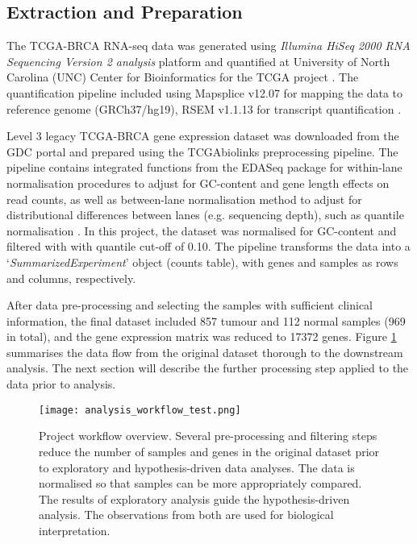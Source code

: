             
    \subsection{Extraction and Preparation}
    
    The TCGA-BRCA RNA-seq data was generated using \textit{Illumina HiSeq 2000 RNA Sequencing Version 2 analysis} platform and quantified at University of North Carolina (UNC) Center for Bioinformatics for the TCGA project \cite{UniversityofNorthCarolinaUNCCenterforBioinfromatics2013TCGAData}. The quantification pipeline included  using Mapsplice v12.07 \cite{wang2010mapsplice} for mapping the data to reference genome (GRCh37/hg19), RSEM v1.1.13 \cite{li2011rsem} for transcript quantification \cite{UniversityofNorthCarolinaUNCCenterforBioinfromatics2013TCGAData}. 

    Level 3 legacy TCGA-BRCA gene expression dataset was downloaded from the GDC portal and prepared using the TCGAbiolinks preprocessing pipeline. The pipeline contains integrated functions from the EDASeq package \cite{risso2011gc} for within-lane normalisation procedures to adjust for GC-content and gene length effects on read counts, as well as between-lane normalisation method to adjust for distributional differences between lanes (e.g. sequencing depth), such as quantile normalisation \cite{Colaprico2016, PapaleoTCGAPackages}. 
    In this project, the dataset was normalised for GC-content and filtered with with quantile cut-off of 0.10. The pipeline transforms the data into a ‘\textit{SummarizedExperiment}' \cite{Huber2015OrchestratingBioconductor} object (counts table), with genes and samples as rows and columns, respectively. 
    
        
    After data pre-processing and selecting the samples with sufficient clinical information, the final dataset included 857 tumour and 112 normal samples (969 in total), and  the gene expression matrix was reduced to 17372 genes. Figure \ref{fig:workflow} summarises the data flow from the original dataset thorough to the downstream analysis. The next section will describe the further processing step applied to the data prior to analysis. 
    
    
            \begin{figure}[h]
            \centering
            \texttt{[image: analysis\_workflow\_test.png]}
            \caption{Project workflow overview. Several pre-processing and filtering steps reduce the number of samples and genes in the original dataset prior to exploratory and hypothesis-driven data analyses. The data is normalised so that samples can be more appropriately compared. The results of exploratory analysis guide the hypothesis-driven analysis. The observations from both are used for biological interpretation. }
            \label{fig:workflow}
            \end{figure} 
    
